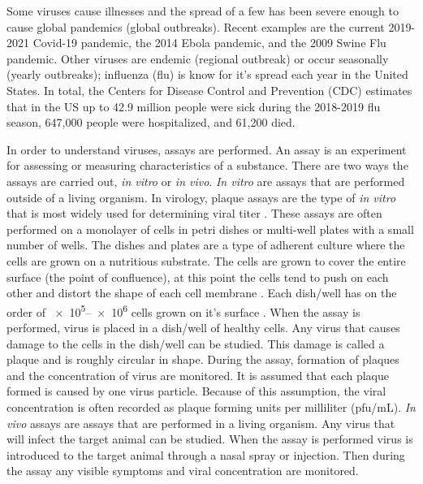 Some viruses cause illnesses and the spread of a few has been severe enough to cause global pandemics (global outbreaks). Recent examples are the current 2019-2021 Covid-19 pandemic, the 2014 Ebola pandemic, and the 2009 Swine Flu pandemic. Other viruses are endemic (regional outbreak) or occur seasonally (yearly outbreaks); influenza (flu) is know for it's spread each year in the United States. In total, the Centers for Disease Control and Prevention (CDC) estimates that in the US up to 42.9 million people were sick during the 2018-2019 flu season, 647,000 people were hospitalized, and 61,200 died. \citep{xu_update_2019}

In order to understand viruses, assays are performed. An assay is an experiment for assessing or measuring characteristics of a substance. There are two ways the assays are carried out, \emph{in vitro} or \emph{in vivo}. \emph{In vitro} are assays that are performed outside of a living organism. In virology, plaque assays are the type of  \emph{in vitro} that is most widely used for determining viral titer \citep{Kumar}.  These assays are often performed on a monolayer of cells in petri dishes or multi-well plates with a small number of wells. The dishes and plates are a type of adherent culture where the cells are grown on a nutritious substrate. The cells are grown to cover the entire surface (the point of confluence), at this point the cells tend to push on each other and distort the shape of each cell membrane \citep{bruckner_importance_2018}. Each dish/well has on the order of \numrange[range-phrase = --]{e5}{e6} cells grown on it's surface \citep{Number_of_cells_in_a_dish_noauthor_useful_nodate}. When the assay is performed, virus is placed in a dish/well of healthy cells. Any virus that causes damage to the cells in the dish/well can be studied. This damage is called a plaque and is roughly circular in shape. During the assay, formation of plaques and the concentration of virus are monitored. It is assumed that each plaque formed is caused by one virus particle. Because of this assumption, the viral concentration is often recorded as plaque forming units per milliliter (pfu/mL). \emph{In vivo} assays are assays that are performed in a living organism. Any virus that will infect the target animal can be studied. When the assay is performed virus is introduced to the target animal through a nasal spray or injection. Then during the assay any visible symptoms and viral concentration are monitored.%

